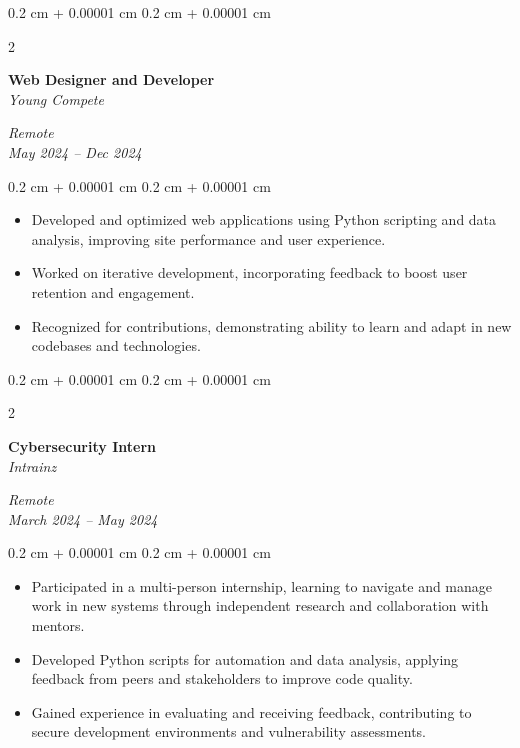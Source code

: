 \documentclass[10pt, letterpaper]{article}
\newenvironment{highlights}{
    \begin{itemize}[
        topsep=0.10 cm,
        parsep=0.10 cm,
        partopsep=0pt,
        itemsep=0pt,
        leftmargin=0.4 cm + 10pt
    ]
}{
    \end{itemize}
} %
\newenvironment{onecolentry}{
    \begin{adjustwidth}{
        0.2 cm + 0.00001 cm
    }{
        0.2 cm + 0.00001 cm
    }
}{
    \end{adjustwidth}
} %
\newenvironment{twocolentry}[2][]{
    \onecolentry
    \def\secondColumn{#2}
    \setcolumnwidth{\fill, 4.5 cm}
    \begin{paracol}{2}
}{
    \switchcolumn \raggedleft \secondColumn
    \end{paracol}
    \endonecolentry
} %
\begin{document}
    \vspace{0.2 cm}
    \begin{twocolentry}{
        \textit{Remote} \\
        \textit{May 2024 – Dec 2024}
    }
        \textbf{Web Designer and Developer} \\
        \textit{Young Compete}
    \end{twocolentry}
    \vspace{0.10 cm}
    \begin{onecolentry}
        \begin{highlights}
            \item Developed and optimized web applications using Python scripting and data analysis, improving site performance and user experience.
            \item Worked on iterative development, incorporating feedback to boost user retention and engagement.
            \item Recognized for contributions, demonstrating ability to learn and adapt in new codebases and technologies.
        \end{highlights}
    \end{onecolentry}
    \vspace{0.2 cm}
    \begin{twocolentry}{
        \textit{Remote} \\
        \textit{March 2024 – May 2024}
    }
        \textbf{Cybersecurity Intern} \\
        \textit{Intrainz}
    \end{twocolentry}
    \vspace{0.10 cm}
    \begin{onecolentry}
        \begin{highlights}
            \item Participated in a multi-person internship, learning to navigate and manage work in new systems through independent research and collaboration with mentors.
            \item Developed Python scripts for automation and data analysis, applying feedback from peers and stakeholders to improve code quality.
            \item Gained experience in evaluating and receiving feedback, contributing to secure development environments and vulnerability assessments.
        \end{highlights}
    \end{onecolentry}
\end{document}
